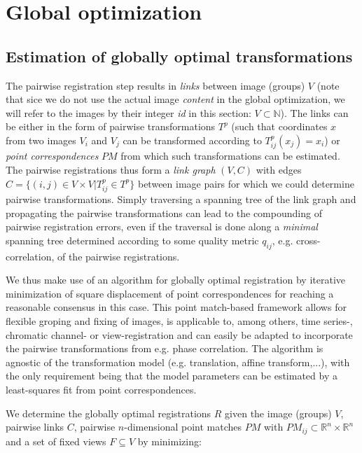 \section{Global optimization}
\label{ssec:globalopt}

\subsection*{Estimation of globally optimal transformations}

The pairwise registration step results in \emph{links} between image (groups) $V$ (note that sice we do not use the actual image \emph{content} in the global optimization, we will refer to the images by their integer \emph{id} in this section: $V \subset \mathbb{N}$). The links can be either in the form of pairwise transformations $T^{p}$  (such that coordinates $x$ from two images $V_i$ and $V_j$ can be transformed according to $T^p_{ij} (x_{j}) = x_i$) or \emph{point correspondences} $PM$ from which such transformations can be estimated.
The pairwise registrations thus form a \emph{link graph} $(V, C)$ with edges $C = \{(i,j) \in V \times V | T^p_{ij} \in T^p \}$ between image pairs for which we could determine pairwise transformations. Simply traversing a spanning tree of the link graph and propagating the pairwise transformations can lead to the compounding of pairwise registration errors, even if the traversal is done along a \emph{minimal} spanning tree determined according to some quality metric $q_{ij}$, e.g. cross-correlation, of the pairwise registrations.

We thus make use of an algorithm for globally optimal registration by iterative minimization of square displacement of point correspondences\cite{saalfeld2010rigid} for reaching a reasonable consensus in this case. This point match-based framework allows for flexible groping and fixing of images, is applicable to, among others, time series-, chromatic channel- or view-registration and can easily be adapted to incorporate the pairwise transformations from e.g. phase correlation. The algorithm is agnostic of the transformation model (e.g. translation, affine transform,...), with the only requirement being that the model parameters can be estimated by a least-squares fit from point correspondences.

We determine the globally optimal registrations $R$ given the image (groups) $V$, pairwise links $C$, pairwise $n$-dimensional point matches $PM$ with $PM_{ij} \subset \mathbb{R}^n \times  \mathbb{R}^n$ and a set of fixed views $F \subseteq V$ by minimizing:

